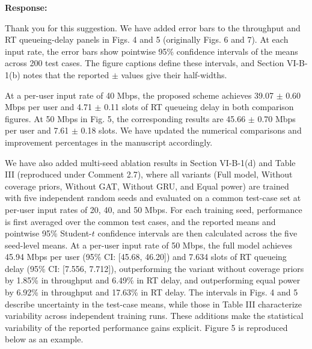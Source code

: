 \documentclass[11pt,a4paper]{article}
\begin{document}
\textbf{Response:}\par

Thank you for this suggestion. We have added error bars to the throughput and RT queueing-delay panels in Figs. 4 and 5 (originally Figs. 6 and 7). At each input rate, the error bars show pointwise 95\% confidence intervals of the means across 200 test cases. The figure captions define these intervals, and Section VI-B-1(b) notes that the reported $\pm$ values give their half-widths.
\par

At a per-user input rate of 40 Mbps, the proposed scheme achieves 39.07 $\pm$ 0.60 Mbps per user and 4.71 $\pm$ 0.11 slots of RT queueing delay in both comparison figures. At 50 Mbps in Fig. 5, the corresponding results are 45.66 $\pm$ 0.70 Mbps per user and 7.61 $\pm$ 0.18 slots. We have updated the numerical comparisons and improvement percentages in the manuscript accordingly.
\par

We have also added multi-seed ablation results in Section VI-B-1(d) and Table III (reproduced under Comment 2.7), where all variants (Full model, Without coverage priors, Without GAT, Without GRU, and Equal power) are trained with five independent random seeds and evaluated on a common test-case set at per-user input rates of 20, 40, and 50 Mbps. For each training seed, performance is first averaged over the common test cases, and the reported means and pointwise 95\% Student-$t$ confidence intervals are then calculated across the five seed-level means. At a per-user input rate of 50 Mbps, the full model achieves 45.94 Mbps per user (95\% CI: [45.68, 46.20]) and 7.634 slots of RT queueing delay (95\% CI: [7.556, 7.712]), outperforming the variant without coverage priors by 1.85\% in throughput and 6.49\% in RT delay, and outperforming equal power by 6.92\% in throughput and 17.63\% in RT delay. The intervals in Figs. 4 and 5 describe uncertainty in the test-case means, while those in Table III characterize variability across independent training runs. These additions make the statistical variability of the reported performance gains explicit. Figure 5 is reproduced below as an example.
\par
\end{document}
